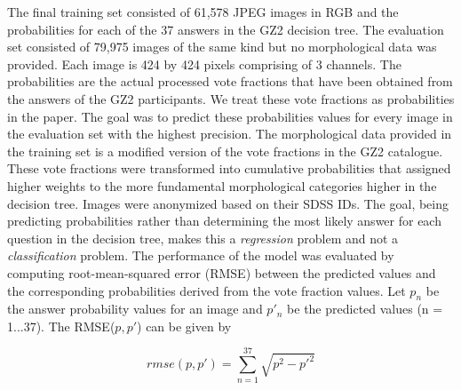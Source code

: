\documentclass[fleqn,usenatbib]{mnras}
\begin{document}
The final training set consisted of 61,578 JPEG images in RGB and the probabilities for each of the 37 answers in the GZ2 decision tree. The evaluation set consisted of 79,975 images of the same kind but no morphological data was provided. Each image is 424 by 424 pixels comprising of 3 channels. The probabilities are the actual processed vote fractions that have been obtained from the answers of the GZ2 participants. We treat these vote fractions as probabilities in the paper. The goal was to predict these probabilities values for every image in the evaluation set with the highest precision. The morphological data provided in the training set is a modified version of the vote fractions in the GZ2 catalogue. These vote fractions were transformed into cumulative probabilities that assigned higher weights to the more fundamental morphological categories higher in the decision tree. Images were anonymized based on their SDSS IDs. The goal, being predicting probabilities rather than determining the most likely answer for each question in the decision tree, makes this a \textit{regression} problem and not a \textit{classification} problem. The performance of the model was evaluated by computing root-mean-squared error (RMSE) between the predicted values and the corresponding probabilities derived from the vote fraction values. Let $p_n$ be the answer probability values for an image and $p'_n$ be the predicted values (n = 1...37). The RMSE($p,p'$) can be given by

\begin{equation}
    rmse(p,p') = \sum_{n=1}^{37}\sqrt{p^2-p'^2}
    \label{RMSE_eq}
\end{equation}
\end{document}
